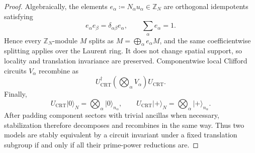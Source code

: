 \documentclass[10pt,a4paper]{amsart}
\begin{document}
\begin{proof}
	Algebraically, the elements
	$e_\alpha\coloneqq N_\alpha u_\alpha\in\mathbb Z_N$ are orthogonal
	idempotents satisfying
	\begin{equation}
		e_\alpha e_\beta
		=
		\delta_{\alpha\beta}e_\alpha,
		\qquad
		\sum_\alpha e_\alpha=1.
	\end{equation}
	Hence every $\mathbb Z_N$-module $M$ splits as
	$M=\bigoplus_\alpha e_\alpha M$, and the same coefficientwise splitting
	applies over the Laurent ring. It does not change spatial support, so
	locality and translation invariance are preserved. Componentwise local
	Clifford circuits $V_\alpha$ recombine as
	\begin{equation}
		U_{\mathrm{CRT}}^\dagger
		\left(\bigotimes_\alpha V_\alpha\right)
		U_{\mathrm{CRT}}.
	\end{equation}
	Finally,
	\begin{equation}
		U_{\mathrm{CRT}}\lvert0\rangle_N
		=
		\bigotimes_\alpha\lvert0\rangle_{n_\alpha},
		\qquad
		U_{\mathrm{CRT}}\lvert+\rangle_N
		=
		\bigotimes_\alpha\lvert+\rangle_{n_\alpha}.
	\end{equation}
	After padding component sectors with trivial ancillas when necessary,
	stabilization therefore decomposes and recombines in the same way. Thus two
	models are stably equivalent by a circuit invariant under a fixed
	translation subgroup if and only if all their prime-power reductions are.
\end{proof}
\end{document}
